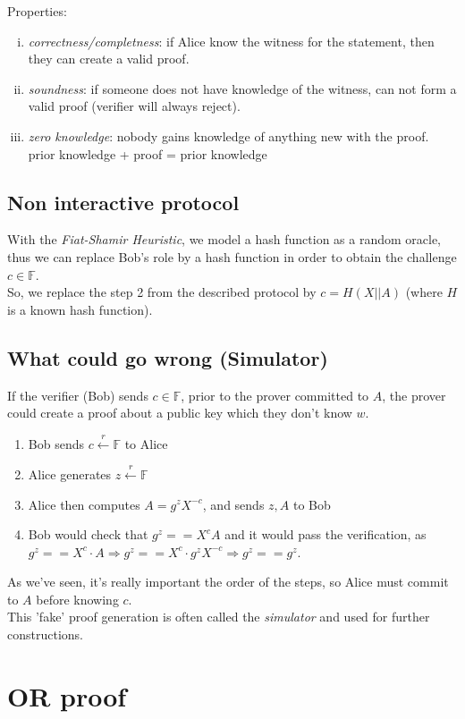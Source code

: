 \documentclass{article}
\theoremstyle{definition}
\begin{document}
Properties:
\begin{enumerate}[i.]
	\item \emph{correctness/completness}: if Alice know the witness for the statement, then they can create a valid proof.
	\item \emph{soundness}: if someone does not have knowledge of the witness, can not form a valid proof (verifier will always reject).
	\item \emph{zero knowledge}: nobody gains knowledge of anything new with the proof. prior knowledge + proof = prior knowledge
\end{enumerate}

\subsection{Non interactive protocol}
With the \emph{Fiat-Shamir Heuristic}, we model a hash function as a random oracle, thus we can replace Bob's role by a hash function in order to obtain the challenge $c \in \mathbb{F}$.
\\
So, we replace the step 2 from the described protocol by $c = H(X || A)$ (where $H$ is a known hash function).

\subsection{What could go wrong (Simulator)}
If the verifier (Bob) sends $c \in \mathbb{F}$, prior to the prover committed to $A$, the prover could create a proof about a public key which they don't know $w$.
\begin{enumerate}[1.]
	\item Bob sends $c \xleftarrow{r} \mathbb{F}$ to Alice
	\item Alice generates $z \xleftarrow{r} \mathbb{F}$
	\item Alice then computes $A = g^z X^{-c}$, and sends $z, A$ to Bob
	\item Bob would check that $g^z == X^c A$ and it would pass the verification, as $g^z== X^c \cdot A \Rightarrow g^z==X^c \cdot g^z X^{-c} \Rightarrow g^z == g^z$.
\end{enumerate}

As we've seen, it's really important the order of the steps, so Alice must commit to $A$ before knowing $c$.\\
This 'fake' proof generation is often called the \emph{simulator} and used for further constructions.

\section{OR proof}
\end{document}
